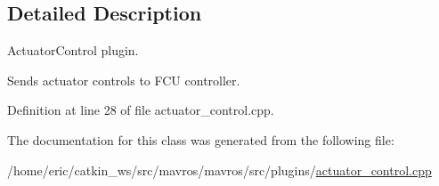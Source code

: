 \subsection{Detailed Description}
Actuator\+Control plugin. 

Sends actuator controls to F\+CU controller. 

Definition at line 28 of file actuator\+\_\+control.\+cpp.



The documentation for this class was generated from the following file\+:\begin{DoxyCompactItemize}
\item 
/home/eric/catkin\+\_\+ws/src/mavros/mavros/src/plugins/\mbox{\hyperlink{actuator__control_8cpp}{actuator\+\_\+control.\+cpp}}\end{DoxyCompactItemize}
